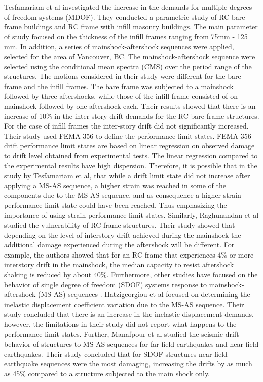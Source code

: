 Tesfamariam et al \cite{Tesfamariam2015} investigated the increase in the demands for multiple degrees of freedom systems (MDOF). They conducted a parametric study of RC bare frame buildings and RC frame with infill masonry buildings. The main parameter of study focused on the thickness of the infill frames ranging from 75mm - 125 mm. In addition, a series of mainshock-aftershock sequences were applied, selected for the area of Vancouver, BC. The mainshock-aftershock sequence were selected using the conditional mean spectra (CMS) over the period range of the structures. The motions considered in their study were different for the bare frame and the infill frames. The bare frame was subjected to a mainshock  followed by three aftershocks, while those of the infill frame consisted of on mainshock followed by one aftershock each. Their results showed that there is an increase of 10\% in the inter-story drift demands for the RC bare frame structures. For the case of infill frames the inter-story drift did not significantly increased. Their study used FEMA 356 \cite{FEMA2000} to define the performance limit states. FEMA 356 drift performance limit states are based on linear regression on observed damage to drift level obtained from experimental tests. The linear regression compared to the experimental results have high dispersion. Therefore, it is possible that in the study by Tesfamariam et al, that while a drift limit state did not increase after applying a MS-AS sequence, a higher strain was reached in some of the components due to the MS-AS sequence, and as consequence a higher strain performance limit state could have been reached. Thus emphasizing the importance of using strain performance limit states. Similarly, Raghunandan et al \cite{Raghunandan2015} studied the vulnerability of RC frame structures. Their study showed that depending on the level of interstory drift achieved during the mainshock the additional damage experienced during the aftershock will be different. For example, the authors showed that for an RC frame that experiences 4\% or more interstory drift in the mainshock, the median capacity to resist aftershock shaking is reduced by about 40\%. Furthermore, other studies have focused on the behavior of single degree of freedom (SDOF) systems response to mainshock-aftershock (MS-AS) sequences \cite{Hatzigeorgiou2009}\cite{Manafpour2019}. Hatzigeorgiou et al focused on determining the inelastic displacement coefficient variation due to the MS-AS sequence. Their study concluded that there is an increase in the inelastic displacement demands, however, the limitations in their study did not report what happens to the performance limit states. Further, Manafpour et al studied the seismic drift behavior of structures to MS-AS sequences for far-field earthquakes and near-field earthquakes. Their study concluded that for SDOF structures near-field earthquake sequences were the most damaging, increasing the drifts by as much as 45\% compared to a structure subjected to the main shock only.

